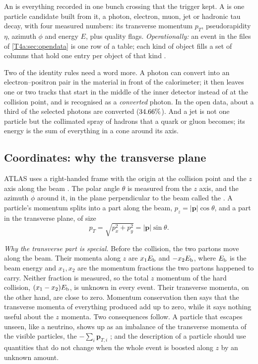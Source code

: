 \begin{workdef}
An  is everything recorded in one bunch crossing that the trigger kept. A  is one particle candidate built from it, a photon, electron, muon, jet or hadronic tau decay, with four measured numbers: its transverse momentum $p_T$, pseudorapidity $\eta$, azimuth $\phi$ and energy $E$, plus quality flags. \emph{Operationally:} an event in the files of \cref{T4a:sec:opendata} is one row of a table; each kind of object fills a set of columns that hold one entry per object of that kind .
\end{workdef}

Two of the identity rules need a word more. A photon can convert into an electron--positron pair in the material in front of the calorimeter; it then leaves one or two tracks that start in the middle of the inner detector instead of at the collision point, and is recognised as a \emph{converted} photon. In the open data, about a third of the selected photons are converted ($34.66\%$). And a jet is not one particle but the collimated spray of hadrons that a quark or gluon becomes; its energy is the sum of everything in a cone around its axis.

\subsection{Coordinates: why the transverse plane}
\label{T4a:sec:coordinates}

ATLAS uses a right-handed frame with the origin at the collision point and the $z$ axis along the beam \cite[footnote 2]{AadHiggs2012}. The polar angle $\theta$ is measured from the $z$ axis, and the azimuth $\phi$ around it, in the plane perpendicular to the beam called the . A particle's momentum splits into a part along the beam, $p_z=\lvert\bm p\rvert\cos\theta$, and a part in the transverse plane, of size
\begin{equation}
  p_T=\sqrt{p_x^2+p_y^2}=\lvert\bm p\rvert\sin\theta .
  \label{T4a:eq:pt}
\end{equation}

\emph{Why the transverse part is special.} Before the collision, the two partons move along the beam. Their momenta along $z$ are $x_1E_{\rm b}$ and $-x_2E_{\rm b}$, where $E_{\rm b}$ is the beam energy and $x_1,x_2$ are the momentum fractions the two partons happened to carry. Neither fraction is measured, so the total $z$ momentum of the hard collision, $(x_1-x_2)E_{\rm b}$, is unknown in every event. Their transverse momenta, on the other hand, are close to zero. Momentum conservation then says that the transverse momenta of everything produced add up to zero, while it says nothing useful about the $z$ momenta. Two consequences follow. A particle that escapes unseen, like a neutrino, shows up as an imbalance of the transverse momenta of the visible particles, the  $-\sum_i\bm p_{T,i}$ \cite[(49.49)]{PDG2024}; and the description of a particle should use quantities that do not change when the whole event is boosted along $z$ by an unknown amount.

